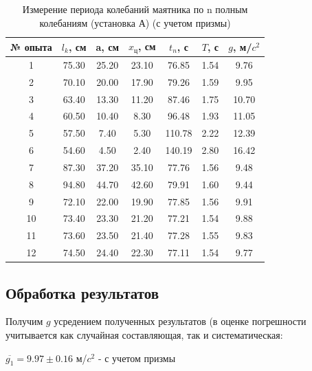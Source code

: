 \documentclass[a4paper,12pt]{article} %
\begin{document}
\begin{table}
\caption{Измерение периода колебаний маятника по n полным колебаниям (установка А) (с учетом призмы)}
\begin{tabular}{|c|c|c|c|c|c|c|}
\hline 
№ опыта & $l_k$, см & a, см & $x_\text{ц}$, см & $t_n$, с & $T$, с & $g$, м/$c^2$ \\ 
\hline 
1 & 75.30 & 25.20 & 23.10 & 76.85 & 1.54 & 9.76 \\ 
\hline
2 & 70.10 & 20.00 & 17.90 & 79.26 & 1.59 & 9.95\\ 
\hline
3 & 63.40 & 13.30 & 11.20 & 87.46 & 1.75 & 10.70\\ 
\hline
4 & 60.50 & 10.40 & 8.30 & 96.48 & 1.93 & 11.05\\ 
\hline
5 & 57.50 & 7.40 & 5.30 & 110.78 & 2.22 & 12.39\\ 
\hline
6 & 54.60 & 4.50 & 2.40 & 140.19 & 2.80 & 16.42\\ 
\hline
7 & 87.30 & 37.20 & 35.10 & 77.76 & 1.56 & 9.48\\ 
\hline
8 & 94.80 & 44.70 & 42.60 & 79.91 & 1.60 & 9.44\\ 
\hline
9 & 72.10 & 22.00 & 19.90 & 77.85 & 1.56 & 9.91\\ 
\hline
10 & 73.40 & 23.30 & 21.20 & 77.21 & 1.54 & 9.88\\ 
\hline
11 & 73.60 & 23.50 & 21.40 & 77.28 & 1.55 & 9.83\\
\hline
12 & 74.50 & 24.40 & 22.30 & 77.11 & 1.54 & 9.77\\ 
\hline

\end{tabular} 
\end{table}
\subsection{Обработка результатов}
Получим $g$ усредением полученных результатов (в оценке погрешности учитывается как случайная составляющая, так и систематическая:

$\overline{g_1} =9.97 \pm  0.16$ м/$c^2$ - с учетом призмы
\end{document}
